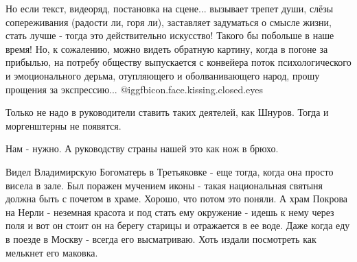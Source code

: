\begin{itemize}
Но если текст, видеоряд, постановка на сцене... вызывает трепет души, слёзы
сопереживания (радости ли, горя ли), заставляет задуматься о смысле жизни,
стать лучше - тогда это действительно искусство! Такого бы побольше в наше
время! Но, к сожалению, можно видеть обратную картину, когда в погоне за
прибылью, на потребу обществу выпускается с конвейера поток психологического и
эмоционального дерьма, отупляющего и оболванивающего народ, прошу прощения за
экспрессию... @igg{fbicon.face.kissing.closed.eyes} 


Только не надо в руководители ставить таких деятелей, как Шнуров. Тогда и моргенштерны не появятся.


Нам - нужно. А руководству страны нашей это как нож в брюхо.


Видел Владимирскую Богоматерь в Третьяковке - еще тогда, когда она просто
висела в зале. Был поражен мучением иконы - такая национальная святыня должна
быть с почетом в храме. Хорошо, что потом это поняли. А храм Покрова на Нерли -
неземная красота и под стать ему окружение - идешь к нему через поля и вот он
стоит он на берегу старицы и отражается в ее воде. Даже когда еду в поезде в
Москву - всегда его высматриваю. Хоть издали посмотреть как мелькнет его
маковка.

\end{itemize} %
